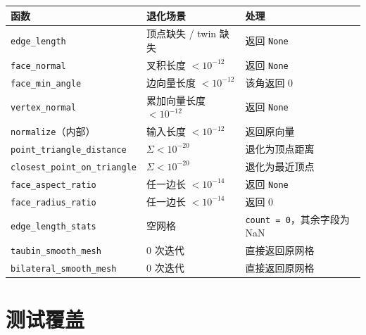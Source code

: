 \documentclass[11pt,a4paper]{article}
\begin{document}
\begin{center}
\renewcommand{\arraystretch}{1.18}
\begin{tabular}{@{}lll@{}}
  \toprule
  \textbf{函数} & \textbf{退化场景} & \textbf{处理} \\
  \midrule
  \texttt{edge\_length}         & 顶点缺失 / twin 缺失 & 返回 \texttt{None} \\
  \texttt{face\_normal}         & 叉积长度 $< 10^{-12}$ & 返回 \texttt{None} \\
  \texttt{face\_min\_angle}     & 边向量长度 $< 10^{-12}$ & 该角返回 $0$ \\
  \texttt{vertex\_normal}       & 累加向量长度 $< 10^{-12}$ & 返回 \texttt{None} \\
  \texttt{normalize}（内部）    & 输入长度 $< 10^{-12}$ & 返回原向量 \\
  \texttt{point\_triangle\_distance} & $\Sigma < 10^{-20}$ & 退化为顶点距离 \\
  \texttt{closest\_point\_on\_triangle} & $\Sigma < 10^{-20}$ & 退化为最近顶点 \\
  \texttt{face\_aspect\_ratio}  & 任一边长 $< 10^{-14}$ & 返回 \texttt{None} \\
  \texttt{face\_radius\_ratio}  & 任一边长 $< 10^{-14}$ & 返回 0 \\
  \texttt{edge\_length\_stats}  & 空网格 & \texttt{count = 0}，其余字段为 NaN \\
  \texttt{taubin\_smooth\_mesh} & 0 次迭代 & 直接返回原网格 \\
  \texttt{bilateral\_smooth\_mesh} & 0 次迭代 & 直接返回原网格 \\
  \bottomrule
\end{tabular}
\end{center}

\section{测试覆盖}
\end{document}
